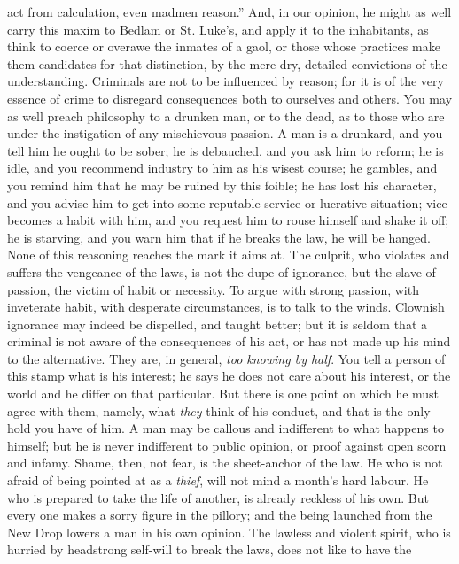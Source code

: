 act from calculation, even madmen reason.'' And, in our opinion,
he might as well carry this maxim to Bedlam or St. Luke's, and
apply it to the inhabitants, as think to coerce or overawe the
inmates of a gaol, or those whose practices make them candidates
for that distinction, by the mere dry, detailed convictions of the
understanding. Criminals are not to be influenced by reason; for
it is of the very essence of crime to disregard consequences both
to ourselves and others. You may as well preach philosophy to a
drunken man, or to the dead, as to those who are under the
instigation of any mischievous passion. A man is a drunkard, and
you tell him he ought to be sober; he is debauched, and you ask
him to reform; he is idle, and you recommend industry to him as
his wisest course; he gambles, and you remind him that he may be
ruined by this foible; he has lost his character, and you advise
him to get into some reputable service or lucrative situation;
vice becomes a habit with him, and you request him to rouse
himself and shake it off; he is starving, and you warn him that if
he breaks the law, he will be hanged. None of this reasoning
reaches the mark it aims at. The culprit, who violates and suffers
the vengeance of the laws, is not the dupe of ignorance, but the
slave of passion, the victim of habit or necessity. To argue with
strong passion, with inveterate habit, with desperate
circumstances, is to talk to the winds. Clownish ignorance may
indeed be dispelled, and taught better; but it is seldom that a
criminal is not aware of the consequences of his act, or has not
made up his mind to the alternative.  They are, in general,
\emph{too knowing by half}. You tell a person of this stamp what
is his interest; he says he does not care about his interest, or
the world and he differ on that particular. But there is one point
on which he must agree with them, namely, what \emph{they} think
of his conduct, and that is the only hold you have of him. A man
may be callous and indifferent to what happens to himself; but he
is never indifferent to public opinion, or proof against open
scorn and infamy. Shame, then, not fear, is the sheet-anchor of
the law. He who is not afraid of being pointed at as a
\emph{thief}, will not mind a month's hard labour. He who is
prepared to take the life of another, is already reckless of his
own.  But every one makes a sorry figure in the pillory; and the
being launched from the New Drop lowers a man in his own
opinion. The lawless and violent spirit, who is hurried by
headstrong self-will to break the laws, does not like to have the
